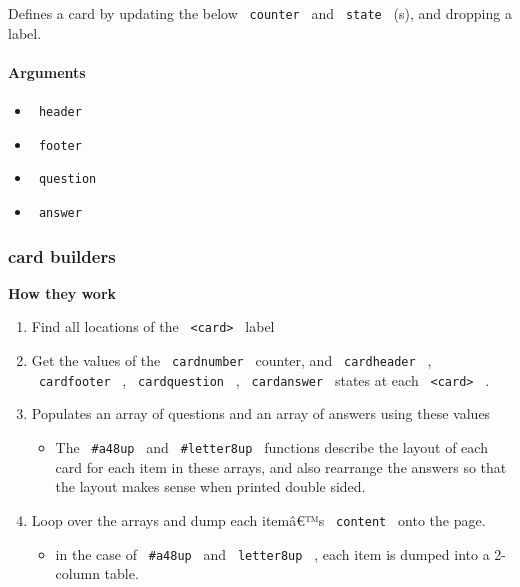 Defines a card by updating the below \texttt{\ counter\ } and
\texttt{\ state\ } (s), and dropping a label.

\begin{Shaded}
\begin{Highlighting}[]
\NormalTok{\#let card(header, footer, question, answer) = [}
\NormalTok{]}
\end{Highlighting}
\end{Shaded}

\paragraph{Arguments}\label{arguments}

\begin{itemize}
\tightlist
\item
  \texttt{\ header\ }
\item
  \texttt{\ footer\ }
\item
  \texttt{\ question\ }
\item
  \texttt{\ answer\ }
\end{itemize}

\subsubsection{card builders}\label{card-builders}

\textbf{How they work}

\begin{enumerate}
\tightlist
\item
  Find all locations of the \texttt{\ \textless{}card\textgreater{}\ }
  label
\item
  Get the values of the \texttt{\ cardnumber\ } counter, and
  \texttt{\ cardheader\ } , \texttt{\ cardfooter\ } ,
  \texttt{\ cardquestion\ } , \texttt{\ cardanswer\ } states at each
  \texttt{\ \textless{}card\textgreater{}\ } .
\item
  Populates an array of questions and an array of answers using these
  values

  \begin{itemize}
  \tightlist
  \item
    The \texttt{\ \#a48up\ } and \texttt{\ \#letter8up\ } functions
    describe the layout of each card for each item in these arrays, and
    also rearrange the answers so that the layout makes sense when
    printed double sided.
  \end{itemize}
\item
  Loop over the arrays and dump each itemâ€™s \texttt{\ content\ } onto
  the page.

  \begin{itemize}
  \tightlist
  \item
    in the case of \texttt{\ \#a48up\ } and \texttt{\ letter8up\ } ,
    each item is dumped into a 2-column table.
  \end{itemize}
\end{enumerate}

